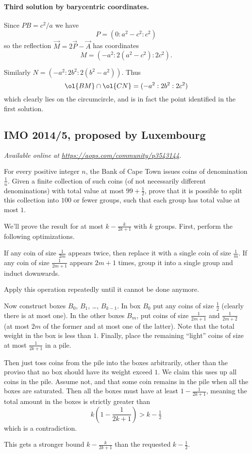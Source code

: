 \documentclass[11pt]{scrartcl}
\begin{document}
\paragraph{Third solution by barycentric coordinates.}
Since $PB = c^2/a$ we have
\[ P = (0 : a^2-c^2 : c^2) \]
so the reflection $\vec M = 2\vec P - \vec A$ has coordinates
\[ M = (-a^2 : 2(a^2-c^2) : 2c^2). \]

Similarly $N = (-a^2 : 2b^2 : 2(b^2-a^2))$. Thus
\[ \ol{BM} \cap \ol{CN} = (-a^2 : 2b^2 : 2c^2) \]
which clearly lies on the circumcircle,
and is in fact the point identified in the first solution.
\pagebreak

\subsection{IMO 2014/5, proposed by Luxembourg}
\textsl{Available online at \url{https://aops.com/community/p3543144}.}
\begin{mdframed}[style=mdpurplebox,frametitle={Problem statement}]
For every positive integer $n$,
the Bank of Cape Town issues coins of denomination $\frac 1n$.
Given a finite collection of such coins (of not necessarily different denominations)
with total value at most $99 + \frac12$, prove that it is possible to split
this collection into $100$ or fewer groups, such that each group has total value at most $1$.
\end{mdframed}
We'll prove the result
for at most $k - \frac{k}{2k+1}$ with $k$ groups.
First, perform the following optimizations.
\begin{itemize}
 \ii If any coin of size $\frac{1}{2m}$ appears twice,
 then replace it with a single coin of size $\frac{1}{m}$.
 \ii If any coin of size $\frac{1}{2m+1}$ appears $2m+1$ times,
 group it into a single group and induct downwards.
\end{itemize}
Apply this operation repeatedly until it cannot be done anymore.

Now construct boxes $B_0$, $B_1$, \dots, $B_{k-1}$.
In box $B_0$ put any coins of size $\tfrac 12$
(clearly there is at most one).
In the other boxes $B_m$, put coins of size
$\frac{1}{2m+1}$ and $\frac{1}{2m+2}$
(at most $2m$ of the former and at most one of the latter).
Note that the total weight in the box is less than $1$.
Finally, place the remaining ``light'' coins of size
at most $\frac{1}{2k+1}$ in a pile.

Then just toss coins from the pile into the boxes arbitrarily,
other than the proviso that no box should have its weight exceed $1$.
We claim this uses up all coins in the pile.
Assume not, and that some coin remains in the pile
when all the boxes are saturated.
Then all the boxes must have at least $1 -\frac{1}{2k+1}$,
meaning the total amount in the boxes is strictly greater than
\[ k \left( 1 - \frac{1}{2k+1} \right) > k - \tfrac 12 \]
which is a contradiction.
\begin{remark*}
This gets a stronger bound $k - \frac{k}{2k+1}$
than the requested $k-\tfrac 12$.
\end{remark*}
\pagebreak
\end{document}
